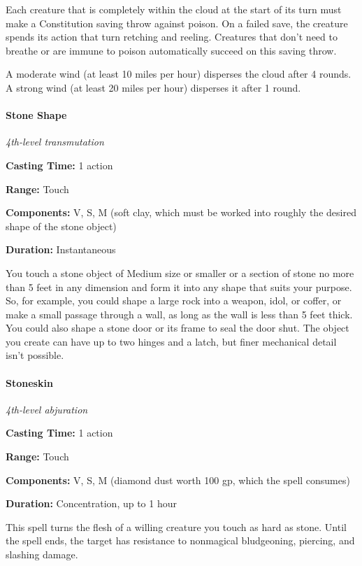 \documentclass[
]{article}
\begin{document}
Each creature that is completely within the cloud at the start of its
turn must make a Constitution saving throw against poison. On a failed
save, the creature spends its action that turn retching and reeling.
Creatures that don't need to breathe or are immune to poison
automatically succeed on this saving throw.

A moderate wind (at least 10 miles per hour) disperses the cloud after 4
rounds. A strong wind (at least 20 miles per hour) disperses it after 1
round.

\hypertarget{stone-shape}{%
\paragraph{Stone Shape}\label{stone-shape}}

\emph{4th-level transmutation}

\textbf{Casting Time:} 1 action

\textbf{Range:} Touch

\textbf{Components:} V, S, M (soft clay, which must be worked into
roughly the desired shape of the stone object)

\textbf{Duration:} Instantaneous

You touch a stone object of Medium size or smaller or a section of stone
no more than 5 feet in any dimension and form it into any shape that
suits your purpose. So, for example, you could shape a large rock into a
weapon, idol, or coffer, or make a small passage through a wall, as long
as the wall is less than 5 feet thick. You could also shape a stone door
or its frame to seal the door shut. The object you create can have up to
two hinges and a latch, but finer mechanical detail isn't possible.

\hypertarget{stoneskin}{%
\paragraph{Stoneskin}\label{stoneskin}}

\emph{4th-level abjuration}

\textbf{Casting Time:} 1 action

\textbf{Range:} Touch

\textbf{Components:} V, S, M (diamond dust worth 100 gp, which the spell
consumes)

\textbf{Duration:} Concentration, up to 1 hour

This spell turns the flesh of a willing creature you touch as hard as
stone. Until the spell ends, the target has resistance to nonmagical
bludgeoning, piercing, and slashing damage.
\end{document}
